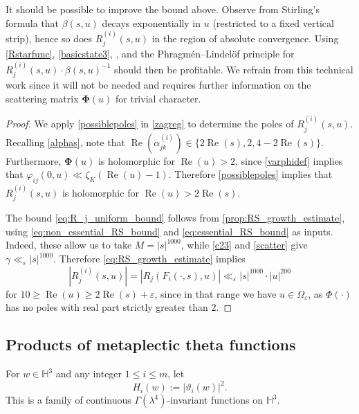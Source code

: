 \documentclass[12pt,reqno]{amsart}
\numberwithin{equation}{section}
\renewcommand{\Re}{\operatorname{Re}}
\begin{document}
\begin{remark}\label{rmk:improved_bound}
    It should be possible to improve the bound above. Observe from Stirling's formula that $\beta(s, u)$ decays exponentially in $u$ (restricted to a fixed vertical strip), hence so does $R_{j}^{(i)}(s, u)$ in the region of absolute convergence. Using \eqref{Rstarfunc}, \eqref{basicstate3}, \cite[Theorem~3.7.1(4)]{FriedJS},  and the Phragm{\'e}n--Lindel{\"o}f principle for $R_{j}^{(i)}(s, u) \cdot \beta(s, u)^{-1}$ should then be profitable. We refrain from this technical work since it will not be needed and requires further information on the scattering matrix $\boldsymbol{\Phi}(u)$ for trivial character.
\end{remark}

\begin{proof}
    We apply \eqref{possiblepoles} in \cref{zagreg} to determine the poles of $R_{j}^{(i)}(s, u)$. Recalling \eqref{alphas}, note that $\Re(\alpha_{jk}^{(i)}) \in \big\{2\Re(s), 2, 4-2\Re(s)\big\}$. Furthermore, $\boldsymbol{\Phi}(u)$ is holomorphic for $\Re(u) > 2$, since \eqref{varphidef} implies that $\varphi_{ij}(0, u) \ll \zeta_K(\Re(u)-1)$. Therefore \eqref{possiblepoles} implies that $R_{j}^{(i)}(s, u)$ is holomorphic for $\Re(u) > 2\Re(s)$. 

    The bound \eqref{eq:R_j_uniform_bound} follows from \cref{prop:RS_growth_estimate}, using \eqref{eq:non_essential_RS_bound} and \eqref{eq:essential_RS_bound} as inputs. Indeed, these allow us to take $M =|{s}|^{1000}$, while \eqref{c23} and \cref{scatter} give $\gamma \ll_\varepsilon |{s}|^{1000}$. Therefore \eqref{eq:RS_growth_estimate} implies
    \begin{equation*}
        |{R_{j}^{(i)}(s, u)}| = |{R_{j}(F_{i}(\cdot,s),u)}| \ll_\varepsilon |{s}|^{1000} \cdot |{u}|^{200}
    \end{equation*}
    for $10 \geq \Re(u) \geq 2\Re(s) + \varepsilon$, since in that range we have $u \in \Omega_\varepsilon$, as $\Phi(\cdot)$ has no poles with real part strictly 
    greater than $2$.
\end{proof}

\subsection{Products of metaplectic theta functions}

For $w \in \mathbb{H}^3$ and any integer $1\leq i\leq m$, let 
\begin{equation} \label{Hidef}
    H_{i}(w):=|\vartheta_{i}(w)|^2.
\end{equation}
This is a family of continuous $\Gamma(\lambda^4)$-invariant functions on $\mathbb{H}^3$.
\end{document}
